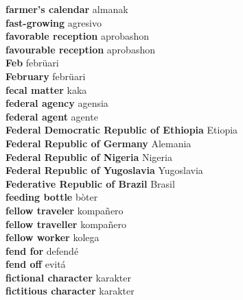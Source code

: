\textbf{ farmer’s calendar  } almanak \\
\textbf{ fast-growing  } agresivo \\
\textbf{ favorable reception  } aprobashon \\
\textbf{ favourable reception  } aprobashon \\
\textbf{ Feb  } febrüari \\
\textbf{ February  } febrüari \\
\textbf{ fecal matter  } kaka \\
\textbf{ federal agency  } agensia \\
\textbf{ federal agent  } agente \\
\textbf{ Federal Democratic Republic of Ethiopia  } Etiopia \\
\textbf{ Federal Republic of Germany  } Alemania \\
\textbf{ Federal Republic of Nigeria  } Nigeria \\
\textbf{ Federal Republic of Yugoslavia  } Yugoslavia \\
\textbf{ Federative Republic of Brazil  } Brasil \\
\textbf{ feeding bottle  } bòter \\
\textbf{ fellow traveler  } kompañero \\
\textbf{ fellow traveller  } kompañero \\
\textbf{ fellow worker  } kolega \\
\textbf{ fend for  } defendé \\
\textbf{ fend off  } evitá \\
\textbf{ fictional character  } karakter \\
\textbf{ fictitious character  } karakter \\
